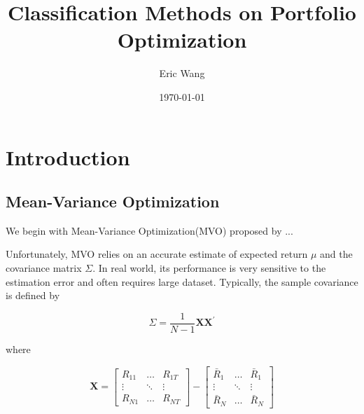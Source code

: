 \documentclass[a4paper]{article}
\title{Classification Methods on Portfolio Optimization}
\author{Eric Wang}
\date{\today}
\begin{document}
\maketitle

\section{Introduction}

\subsection{Mean-Variance Optimization}

We begin with Mean-Variance Optimization(MVO) proposed by \cite{markowitz_portfolio_1952}...

Unfortunately, MVO relies on an accurate estimate of expected return $\mu$ and the covariance matrix $\Sigma$. In real world, its performance is very sensitive to the estimation error and often requires large dataset. Typically, the sample covariance is defined by

$$
\Sigma=\frac{1}{N-1} \mathbf{X X}^{\prime}
$$

where

$$
\mathbf{X}=\left[\begin{array}{ccc}
    R_{11} & \ldots & R_{1 T} \\
    \vdots & \ddots & \vdots \\
    R_{N 1} & \ldots & R_{N T}
    \end{array}\right]-\left[\begin{array}{ccc}
    \bar{R}_1 & \ldots & \bar{R}_1 \\
    \vdots & \ddots & \vdots \\
    \bar{R}_N & \ldots & \bar{R}_N
    \end{array}\right]
$$




\end{document}
